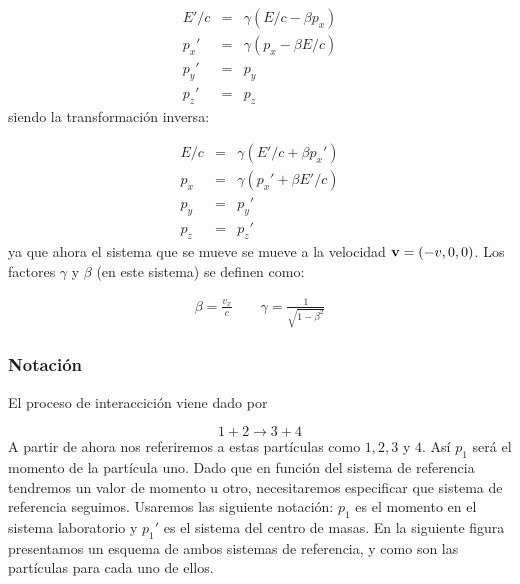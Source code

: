 \begin{eqnarray}
    E'/c &  = & \gamma (E/c-\beta p_x) \label{Ec:04}\\ 
    p_x' &  = & \gamma (p_x - \beta E/c) \label{Ec:05}\\ 
    p_y' &  = & p_y \\
    p_z' &  = & p_z 
\end{eqnarray}
siendo la transformación inversa:

\begin{eqnarray}
    E/c &  = & \gamma (E'/c +\beta p_x') \label{Ec:08}\\ 
    p_x &  = & \gamma (p_x' + \beta E'/c) \label{Ec:09}\\ 
    p_y &  = & p_y '\\
    p_z &  = & p_z '
\end{eqnarray}
ya que ahora el sistema que se mueve se mueve a la velocidad $\mathbf{v}=(-v,0,0)$. Los factores $\gamma$ y $\beta$ (en este sistema) se definen como:

\begin{eqnarray}
    \beta = \frac{v_x}{c} \quad \quad \gamma = \frac{1}{\sqrt{1- \beta^2}}
\end{eqnarray}

\subsubsection{Notación}

El proceso de interaccición viene dado por

\begin{equation}
    1 + 2 \rightarrow 3 + 4
\end{equation}
A partir de ahora nos referiremos a estas partículas como $1,2,3$ y $4$. Así $p_{1}$ será el momento de la partícula uno. Dado que en función del sistema de referencia tendremos un valor de momento u otro, necesitaremos especificar que sistema de referencia seguimos. Usaremos las siguiente notación: $p_{1}$ es el momento en el sistema laboratorio y $p_{1}'$ es el sistema del centro de masas. En la siguiente figura presentamos un esquema de ambos sistemas de referencia, y como son las partículas para cada uno de ellos.  

